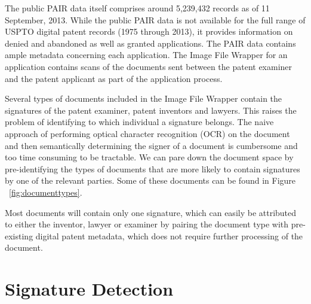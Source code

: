 \documentclass[12pt]{article}
\begin{document}
The public PAIR data itself comprises around 5,239,432 records as of 11 September, 2013. %
While the public PAIR data is not available for the full range of USPTO digital patent records (1975 through 2013), it provides information on denied and abandoned as well as granted applications.
The PAIR data contains ample metadata concerning each application. The Image File Wrapper for an application contains scans of the documents sent between the patent examiner and the patent applicant as part of the application process. 

Several types of documents included in the Image File Wrapper contain the signatures of the patent examiner, patent inventors and lawyers. This raises the problem of identifying to which individual a signature belongs. The naive approach of performing optical character recognition (OCR) on the document and then semantically determining the signer of a document is cumbersome and too time consuming to be tractable. We can pare down the document space by pre-identifying the types of documents that are more likely to contain signatures by one of the relevant parties. Some of these documents can be found in Figure ~\ref{fig:documenttypes}.

Most documents will contain only one signature, which can easily be attributed to either the inventor, lawyer or examiner by pairing the document type with pre-existing digital patent metadata, which does not require further processing of the document.

\section{Signature Detection}
\end{document}
